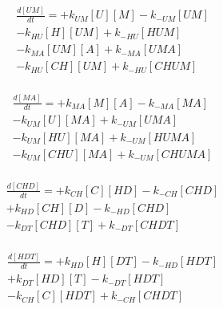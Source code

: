 \begin{equation}
\begin{split}
\frac{d[UM]}{dt} =    + k_{UM}[U][M]    - k_{-UM}[UM]     \\%
                      - k_{HU}[H][UM]   + k_{-HU}[HUM]    \\%
                      - k_{MA}[UM][A]   + k_{-MA}[UMA]    \\%
                      - k_{HU}[CH][UM]  + k_{-HU}[CHUM]   \\%
\end{split}
\end{equation}

\begin{equation}
\begin{split}
\frac{d[MA]}{dt} =    + k_{MA}[M][A]    - k_{-MA}[MA]     \\%
                      - k_{UM}[U][MA]   + k_{-UM}[UMA]    \\%
                      - k_{UM}[HU][MA]  + k_{-UM}[HUMA]   \\%
                      - k_{UM}[CHU][MA] + k_{-UM}[CHUMA]  \\%
\end{split}
\end{equation}

\begin{equation}
\begin{split}
\frac{d[CHD]}{dt} =   + k_{CH}[C][HD]  - k_{-CH}[CHD]     \\%
                      + k_{HD}[CH][D]  - k_{-HD}[CHD]     \\%
                      - k_{DT}[CHD][T] + k_{-DT}[CHDT]    \\%
\end{split}
\end{equation}


\begin{equation}
\begin{split}
\frac{d[HDT]}{dt} =   + k_{HD}[H][DT]  - k_{-HD}[HDT]     \\%
                      + k_{DT}[HD][T]  - k_{-DT}[HDT]     \\%
                      - k_{CH}[C][HDT] + k_{-CH}[CHDT]    \\%
\end{split}
\end{equation}

